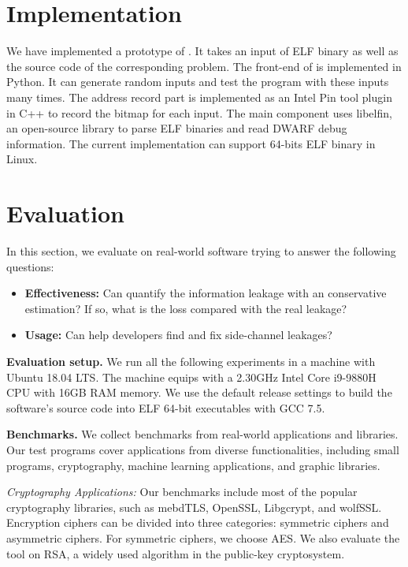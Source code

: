\section{Implementation}
We have implemented a prototype of \ctool{}. It takes an input of ELF binary as well as the source code of the corresponding problem. The front-end of \ctool{} is implemented in Python. It can generate random inputs and test the program with these inputs many times.  The address record part is implemented as an Intel Pin tool plugin in C++ to record the bitmap for each input. The main component uses \textsf{libelfin}, an open-source library to parse ELF binaries and read DWARF debug information. The current implementation can support  64-bits ELF binary in Linux. 

\section{Evaluation}
In this section, we evaluate \ctool{} on real-world software trying to answer the following questions:

\begin{itemize}
\item \textbf{Effectiveness:} Can \ctool{} quantify the information leakage with an conservative estimation? If so, what is the loss compared with the real leakage?
\item \textbf{Usage:}  Can \ctool{} help developers find and fix side-channel leakages?
\end{itemize}

\textbf{Evaluation setup.} We run all the following experiments in a machine with Ubuntu 18.04 LTS. The machine equips with a 2.30GHz Intel Core i9-9880H CPU with 16GB RAM memory. We use the default release settings to build the software's source code into ELF 64-bit executables with GCC 7.5. 

\textbf{Benchmarks.} 
We collect benchmarks from real-world applications and libraries. Our test programs cover applications from diverse functionalities, including small programs, cryptography, machine learning applications, and graphic libraries. 



\textit{Cryptography Applications:} Our benchmarks include most of the popular cryptography libraries, such as mebdTLS, OpenSSL, Libgcrypt, and wolfSSL. Encryption ciphers can be divided into three categories:  symmetric ciphers and asymmetric ciphers. For symmetric ciphers, we choose AES. We also evaluate the tool on RSA, a widely used algorithm in the public-key cryptosystem.

